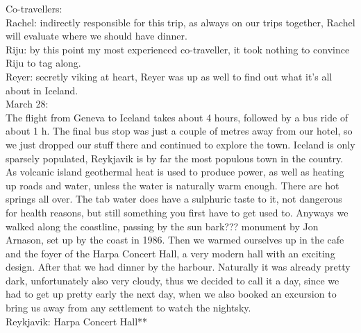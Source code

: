 Co-travellers:\\
Rachel: indirectly responsible for this trip, as always on our trips together, Rachel will evaluate where we should have dinner.\\

Riju: by this point my most experienced co-traveller, it took nothing to convince Riju to tag along.\\

Reyer: secretly viking at heart, Reyer was up as well to find out what it's all about in Iceland.\\

March 28:\\

The flight from Geneva to Iceland takes about 4 hours, followed by a bus ride of about 1 h. The final bus stop was just a couple of metres away from our hotel, so we just dropped our stuff there and continued to explore the town. Iceland is only sparsely populated, Reykjavik is by far the most populous town in the country. As volcanic island geothermal heat is used to produce power, as well as heating up roads and water, unless the water is naturally warm enough. There are hot springs all over. The tab water does have a sulphuric taste to it, not dangerous for health reasons, but still something you first have to get used to. Anyways we walked along the coastline, passing by the sun bark??? monument by Jon Arnason, set up by the coast in 1986. Then we warmed ourselves up in the cafe and the foyer of the Harpa Concert Hall, a very modern hall with an exciting design. After that we had dinner by the harbour. Naturally it was already pretty dark, unfortunately also very cloudy, thus we decided to call it a day, since we had to get up pretty early the next day, when we also booked an excursion to bring us away from any settlement to watch the nightsky.\\

Reykjavik: Harpa Concert Hall**\\

